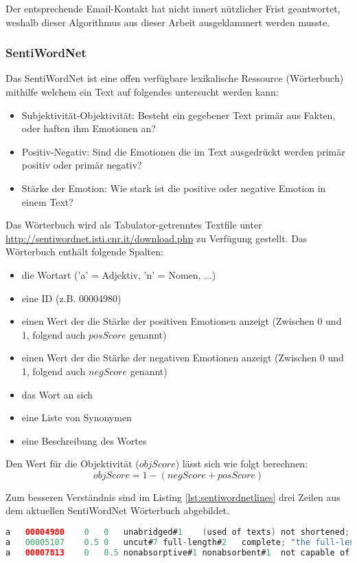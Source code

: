 Der entsprechende Email-Kontakt hat nicht innert nützlicher Frist geantwortet, weshalb dieser Algorithmus aus dieser Arbeit ausgeklammert werden musste.

\subsubsection{SentiWordNet}
Das SentiWordNet ist eine offen verfügbare lexikalische Ressource (Wörterbuch) mithilfe welchem ein Text auf folgendes untersucht werden kann:
\begin{itemize}
\item Subjektivität-Objektivität: Besteht ein gegebener Text primär aus Fakten, oder haften ihm Emotionen an?
\item Positiv-Negativ: Sind die Emotionen die im Text ausgedrückt werden primär positiv oder primär negativ?
\item Stärke der Emotion: Wie stark ist die positive oder negative Emotion in einem Text?
\end{itemize}   
Das Wörterbuch wird als Tabulator-getrenntes Textfile unter \url{http://sentiwordnet.isti.cnr.it/download.php} zu Verfügung gestellt. 
Das Wörterbuch enthält folgende Spalten:
\begin{itemize}
\item die Wortart ('a' = Adjektiv, 'n' = Nomen, ...)
\item eine ID (z.B. 00004980)
\item einen Wert der die Stärke der positiven Emotionen anzeigt (Zwischen 0 und 1, folgend auch $posScore$ genannt)
\item einen Wert der die Stärke der negativen Emotionen anzeigt (Zwischen 0 und 1, folgend auch $negScore$ genannt)
\item das Wort an sich
\item eine Liste von Synonymen
\item eine Beschreibung des Wortes
\end{itemize}

Den Wert für die Objektivität ($objScore$) lässt sich wie folgt berechnen: 
\begin{equation}
	objScore = 1-(negScore+posScore)
\end{equation}

Zum besseren Verständnis sind im Listing \ref{lst:sentiwordnetlines} drei Zeilen aus dem aktuellen SentiWordNet Wörterbuch abgebildet.

\begin{lstlisting}[language=Java, showtabs=true, caption={SentiWordNet Zeile)}, label={lst:sentiwordnetlines}]
a	00004980	0	0	unabridged#1	(used of texts) not shortened; "an unabridged novel"
a	00005107	0.5	0	uncut#7 full-length#2	complete; "the full-length play"
a	00007813	0	0.5	nonabsorptive#1 nonabsorbent#1	not capable of absorbing or soaking up (liquids)
\end{lstlisting}

